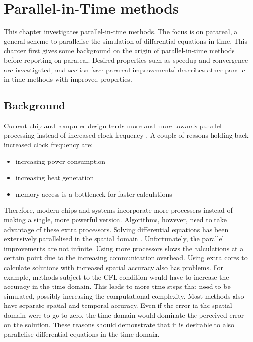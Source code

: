 \chapter{Parallel-in-Time methods}
\label{cha: pint}
This chapter investigates parallel-in-time methods. The focus is on parareal, a general scheme to parallelise the simulation of differential equations in time. This chapter first gives some background on the origin of parallel-in-time methods before reporting on parareal. Desired properties such as speedup and convergence are investigated, and section \ref{sec: parareal improvements} describes other parallel-in-time methods with improved properties.
\section{Background}
\label{sec: pint background}
Current chip and computer design tends more and more towards parallel processing instead of increased clock frequency \cite{bautista_intel_nodate}. A couple of reasons holding back increased clock frequency are: 
\begin{itemize}
    \item increasing power consumption
    \item increasing heat generation
    \item memory access is a bottleneck for faster calculations
\end{itemize}
Therefore, modern chips and systems incorporate more processors instead of making a single, more powerful version. 
Algorithms, however, need to take advantage of these extra processors. Solving differential equations has been extensively parallelised in the spatial domain \cite{adams_parallel_1999,du_expandable_2020}. Unfortunately, the parallel improvements are not infinite. Using more processors slows the calculations at a certain point due to the increasing communication overhead. Using extra cores to calculate solutions with increased spatial accuracy also has problems. For example, methods subject to the CFL condition would have to increase the accuracy in the time domain. This leads to more time steps that need to be simulated, possibly increasing the computational complexity. Most methods also have separate spatial and temporal accuracy. Even if the error in the spatial domain were to go to zero, the time domain would dominate the perceived error on the solution. These reasons should demonstrate that it is desirable to also parallelise differential equations in the time domain. 

